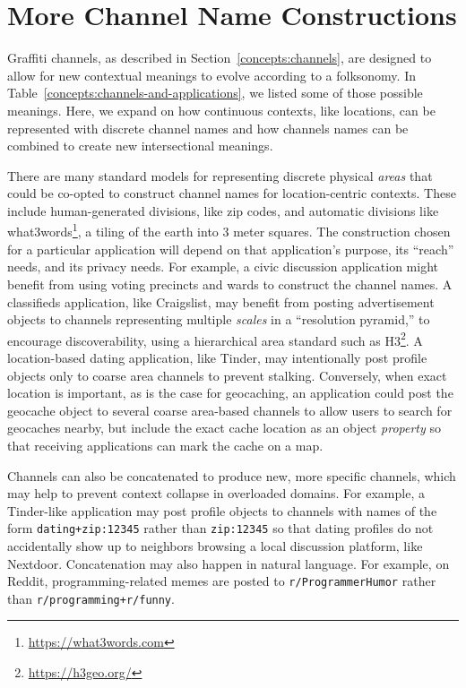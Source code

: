 \section{More Channel Name Constructions}
\label{appendix:more-channel-names}

Graffiti channels, as described in
Section~\ref{concepts:channels},
are designed to allow for new contextual meanings to evolve according to a folksonomy.
In Table~\ref{concepts:channels-and-applications},
we listed some of those possible meanings.
Here, we expand on how continuous
contexts, like locations, can be represented with
discrete channel names and how channels names
can be combined to create new
intersectional meanings.


There are many standard models for representing
discrete physical \emph{areas} that could be co-opted to construct channel
names for location-centric contexts. These include
human-generated divisions, like zip codes,
and automatic divisions like what3words\footnote{
    \url{https://what3words.com}
}, a tiling of the earth into 3 meter squares.
The construction chosen for a particular application will
depend on that application's purpose,
its ``reach'' needs, and its privacy needs.
For example, a civic discussion application
might benefit from using voting precincts and wards
to construct the channel names.
A classifieds application, like Craigslist, may benefit from posting
advertisement objects to channels representing multiple \emph{scales}
in a ``resolution pyramid,'' to encourage discoverability,
using a hierarchical area standard such as H3\footnote{
    \url{https://h3geo.org/}
}.
A location-based dating application, like Tinder, may intentionally
post profile objects only to coarse area channels to prevent stalking.
Conversely, when exact location is important,
as is the case for geocaching, an application could post the geocache
object to several coarse area-based channels to allow users
to search for geocaches nearby, but include
the exact cache location as an object \emph{property}
so that receiving applications can mark the cache on a map.

Channels can also be concatenated to produce new, more specific channels,
which may help to prevent context collapse in overloaded domains.
For example, a Tinder-like application may post profile objects
to channels with names of the form
\texttt{dating+\allowbreak{}zip:\allowbreak{}12345} rather than
\texttt{zip:\allowbreak{}12345} so that dating profiles
do not accidentally show up to neighbors browsing a local
discussion platform, like Nextdoor.
Concatenation may also happen in natural language.
For example, on Reddit,
programming-related memes are posted to \texttt{r/\allowbreak{}Programmer\allowbreak{}Humor}
rather than \texttt{r/\allowbreak{}programming+\allowbreak{}r/funny}.

